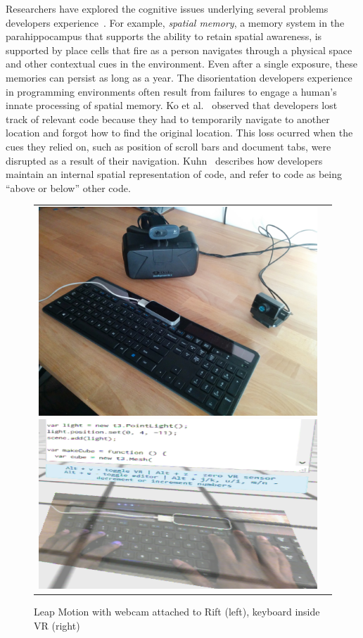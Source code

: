 \documentclass[conference]{IEEEtran}
\begin{document}
Researchers have explored the cognitive issues underlying several problems developers experience~\cite{Parnin:2012}.
For example, \emph{spatial memory}, a memory system in the parahippocampus that supports the ability to retain spatial awareness, is supported by place cells that fire as a person navigates through a physical space and other contextual cues in the environment.  Even after a single exposure, these memories can persist as long as a year.  The disorientation developers experience in programming environments often result from failures to engage a human's innate processing of spatial memory. Ko et al.~\cite{Ko:2006} observed that developers lost track of relevant code because they had to temporarily navigate to another location and forgot how to find the original location. This loss ocurred when the cues they relied on, such as position of scroll bars and document tabs, were disrupted as a result of their navigation.  Kuhn~\cite{Kuhn:2010} describes how developers maintain an internal spatial representation of code, and refer to code as being ``above or below'' other code.

\begin{figure}[ht]
\centering
\begin{tabular}{cc}
	\includegraphics[width=.45\linewidth]{figures/setup/equipment}\label{fig:rift}
 	\includegraphics[width=.45\linewidth]{figures/setup/webcam_passthrough}\label{fig:leap}
\end{tabular}
\caption{Leap Motion with webcam attached to Rift (left), keyboard inside VR (right)}
\end{figure}
\end{document}
